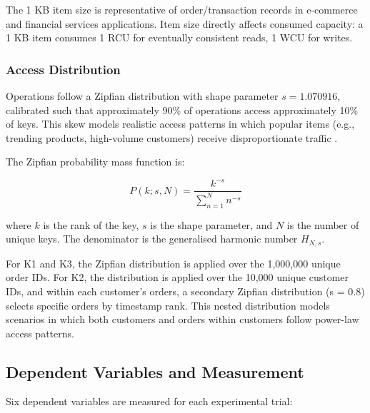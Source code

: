 The 1 KB item size is representative of order/transaction records in e-commerce and financial services applications. Item size directly affects consumed capacity: a 1 KB item consumes 1 RCU for eventually consistent reads, 1 WCU for writes.

\subsubsection{Access Distribution}

Operations follow a Zipfian distribution with shape parameter $s = 1.070916$, calibrated such that approximately 90\% of operations access approximately 10\% of keys. This skew models realistic access patterns in which popular items (e.g., trending products, high-volume customers) receive disproportionate traffic \citep{kanellis2025f2, ziegler2023oltp}.

The Zipfian probability mass function is:

\begin{equation}
P(k; s, N) = \frac{k^{-s}}{\sum_{n=1}^{N} n^{-s}}
\end{equation}

where $k$ is the rank of the key, $s$ is the shape parameter, and $N$ is the number of unique keys. The denominator is the generalised harmonic number $H_{N,s}$.

For K1 and K3, the Zipfian distribution is applied over the 1,000,000 unique order IDs. For K2, the distribution is applied over the 10,000 unique customer IDs, and within each customer's orders, a secondary Zipfian distribution (s = 0.8) selects specific orders by timestamp rank. This nested distribution models scenarios in which both customers and orders within customers follow power-law access patterns.

\subsection{Dependent Variables and Measurement}

Six dependent variables are measured for each experimental trial:

